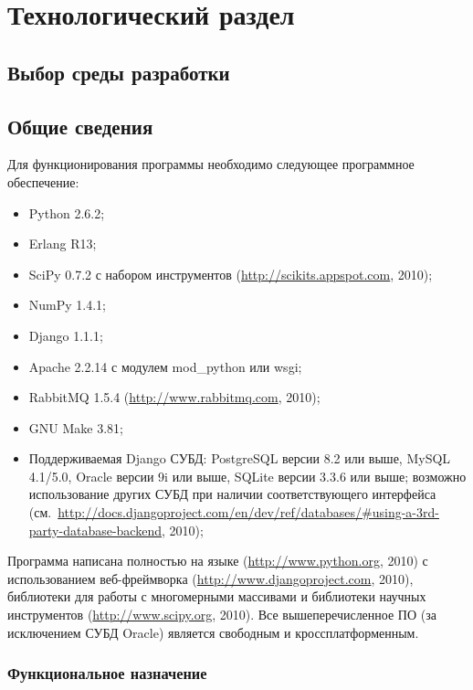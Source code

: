 \chapter{Технологический раздел}
\section{Выбор среды разработки}

\section{Общие сведения}
\label{sec:soft_description:general}

Для функционирования программы необходимо следующее программное обеспечение:
\begin{itemize}
\item Python 2.6.2;
\item Erlang R13;
\item SciPy 0.7.2 с набором инструментов  (\url{http://scikits.appspot.com}, 2010);
\item NumPy 1.4.1;
\item Django 1.1.1;
\item Apache 2.2.14 с модулем mod\_python или wsgi;
\item RabbitMQ 1.5.4 (\url{http://www.rabbitmq.com}, 2010);
\item GNU Make 3.81;
\item Поддерживаемая Django СУБД: PostgreSQL версии 8.2 или выше, MySQL 4.1/5.0, Oracle версии 9i или выше, SQLite версии 3.3.6 или выше; возможно использование других СУБД при наличии соответствующего интерфейса (см.~\url{http://docs.djangoproject.com/en/dev/ref/databases/#using-a-3rd-party-database-backend}, 2010);
\end{itemize}

Программа написана полностью на языке  (\url{http://www.python.org}, 2010) с использованием веб-фреймворка  (\url{http://www.djangoproject.com}, 2010), библиотеки для работы с многомерными массивами  и библиотеки научных инструментов  (\url{http://www.scipy.org}, 2010). Все вышеперечисленное ПО (за исключением СУБД Oracle) является свободным и кроссплатформенным.

\subsection{Функциональное назначение}

